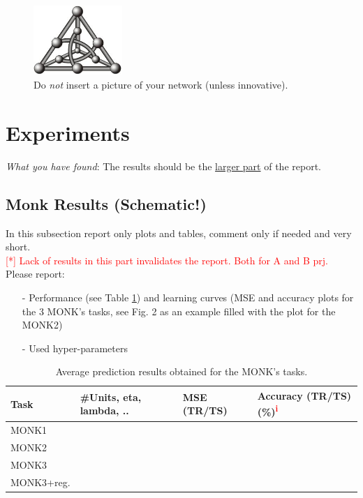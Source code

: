 \documentclass[11pt, letterpaper]{article}  %
\begin{document}
\begin{figure}[h]
\centering
\includegraphics[width=0.3\textwidth]{figure.jpg}
\caption{Do \textit{not} insert a picture of your network (unless innovative).}
\label{fig:myfigure}
\end{figure}

\newpage
\section{Experiments}
\label{sec:experiments}
\textit{What you have found}: The results should be the \underline{larger part} of the report.

\vspace{-0.5cm}\subsection{Monk Results (Schematic!)}
In this subsection report only plots and tables, comment only if needed and very short. \\
\textcolor{red}{[*] Lack of results in this part invalidates the report.  Both for A and B prj.} \\
Please report:
\vspace{-0.4cm}\begin{itemize}
    \setlength\itemsep{-0.5em}
    \item[-] Performance (see Table \ref{tab:monk-table}) and learning curves (MSE and accuracy plots for the 3 MONK’s tasks, see Fig. 2 as an example filled with the plot for the MONK2)
    \item[-] Used hyper-parameters
\end{itemize}
\vspace{-0.5cm}\begin{table}[h]
\centering
\small
\begin{tabular}{|l|l|l|l|}
\hline
\textbf{Task} & \textbf{\#Units, eta, lambda, ..} & \textbf{MSE (TR/TS)} & \textbf{Accuracy (TR/TS)(\%)\textsuperscript{\textcolor{red}{i}}} \\ \hline
MONK1         &                                   &                      &                                \\ \hline
MONK2         &                                   &                      &                                \\ \hline
MONK3         &                                   &                      &                                \\ \hline
MONK3+reg. &                                   &                      &                                \\ \hline
\end{tabular}
\caption{Average prediction results obtained for the MONK’s tasks.}
\label{tab:monk-table}
\end{table}
\end{document}

